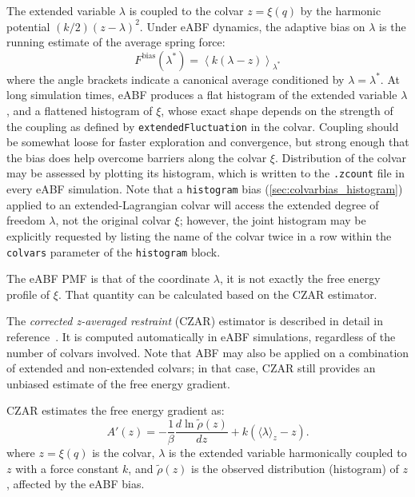 The extended variable $\lambda$ is coupled to the colvar $z=\xi(q)$ by the harmonic potential
$(k/2) (z - \lambda)^2$.
Under eABF dynamics, the adaptive bias on $\lambda$ is
the running estimate of the average spring force:
\begin{equation}
F^{\mathrm{bias}}(\lambda^{*}) = \left\langle k(\lambda{} - z) \right\rangle_{\lambda^{*}}
\end{equation}
where the angle brackets indicate a canonical average conditioned by $\lambda=\lambda^*$.
At long simulation times, eABF produces a flat histogram of the extended variable $\lambda$,
and a flattened histogram of $\xi$, whose exact shape depends on the strength of the coupling
as defined by \texttt{extendedFluctuation} in the colvar.
Coupling should be somewhat loose for faster exploration and convergence, but strong
enough that the bias does help overcome barriers along the colvar $\xi$.\cite{Lesage2017}
Distribution of the colvar may be assessed by plotting its histogram, which
is written to the \outputName\texttt{.zcount} file in every eABF simulation.
Note that a \texttt{histogram} bias (\ref{sec:colvarbias_histogram})
applied to an extended-Lagrangian colvar
will access the extended degree of freedom $\lambda$, not the original colvar $\xi$;
however, the joint histogram may be explicitly requested by listing the name of the
colvar twice in a row within the \texttt{colvars} parameter of the \texttt{histogram} block.

The eABF PMF is that of the coordinate $\lambda$, it is not exactly the free energy profile of $\xi$.
That quantity can be calculated based on  the CZAR
estimator.



The \emph{corrected z-averaged restraint} (CZAR) estimator
is described in detail in reference~\cite{Lesage2017}.
It is computed automatically in eABF simulations,
regardless of the number of colvars involved.
Note that ABF may also be applied on a combination of extended and non-extended
colvars; in that case, CZAR still provides an unbiased estimate of the free energy gradient.

CZAR estimates the free energy gradient as:
\begin{equation}
A'(z) = - \frac{1}{\beta} \frac{d\ln  \tilde \rho (z)}{dz}  + k (\langle\lambda\rangle_z - z).
\label{eq:czar}
\end{equation}
where $z=\xi(q)$ is the colvar, $\lambda$ is the extended variable harmonically
coupled to $z$ with a force constant $k$, and $\tilde\rho (z)$ is the observed
distribution (histogram) of $z$, affected by the eABF bias.

